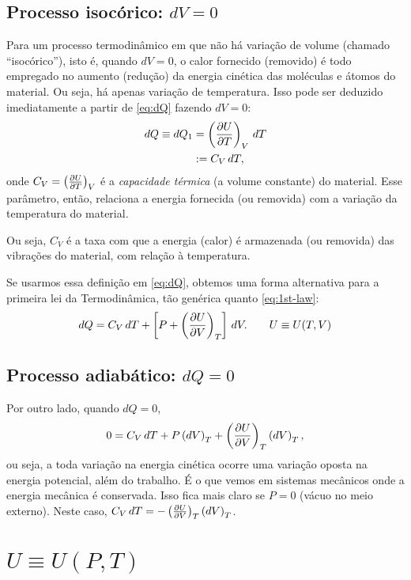 \documentclass[a4paper,12pt]{scrartcl}
\begin{document}
  \subsection{Processo isocórico: $dV = 0$}
  
  Para um processo termodinâmico em que não há variação de volume (chamado ``isocórico''), isto é, quando $dV = 0$, o calor fornecido (removido) é todo empregado no aumento (redução) da energia cinética das moléculas e átomos do material. Ou seja, há apenas variação de temperatura. Isso pode ser deduzido imediatamente a partir de \eqref{eq:dQ} fazendo $dV = 0$:
  \begin{align*}
  dQ \equiv dQ_1 &= \left(\frac{\partial U}{\partial T}\right)_{V}\, dT\\
                 &:= C_V\, dT,
  \end{align*}
  onde $C_V = \left(\frac{\partial U}{\partial T}\right)_{V}$ é a \emph{capacidade térmica} (a volume constante) do material. Esse parâmetro, então, relaciona a energia fornecida (ou removida) com a variação da temperatura do material.
  
  Ou seja, $C_V$ é a taxa com que a energia (calor) é armazenada (ou removida) das vibrações do material, com relação à temperatura.
  
  Se usarmos essa definição em \eqref{eq:dQ}, obtemos uma forma alternativa para a primeira lei da Termodinâmica, tão genérica quanto \eqref{eq:1st-law}:
  \begin{equation}
  dQ = C_V\, dT + \left[P + \left(\frac{\partial U}{\partial V}\right)_{T}\right]\, dV.\qquad U\equiv U(T,V)
  \end{equation}
  
  \subsection*{Processo adiabático: $dQ = 0$}
  
  Por outro lado, quando $dQ = 0$,
  \begin{equation*}
  0 = C_V\, dT + P\left(dV\right)_T + \left(\frac{\partial U}{\partial V}\right)_{T}\left(dV\right)_T,
  \end{equation*}
  ou seja, a toda variação na energia cinética ocorre uma variação oposta na energia potencial, além do trabalho. É o que vemos em sistemas mecânicos onde a energia mecânica é conservada. Isso fica mais claro se $P = 0$ (vácuo no meio externo). Neste caso, $C_V\, dT = - \left(\frac{\partial U}{\partial V}\right)_{T}\left(dV\right)_T$.

  

  
\section{$U \equiv U(P,T)$}
  
\end{document}
